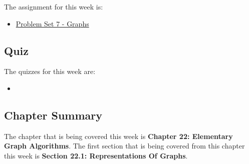The assignment for this week is:

\begin{itemize}
    \item \href{https://github.com/QuantumCompiler/CU/tree/main/CSPB%203104%20-%20Algorithms/Assignments/Problem%20Sets/Problem%20Set%207%20-%20Graphs}{Problem Set 7 - Graphs}
\end{itemize}

\subsection{Quiz}

The quizzes for this week are:

\begin{itemize}
    \item {}
\end{itemize}

\subsection{Chapter Summary}

The chapter that is being covered this week is \textbf{Chapter 22: Elementary Graph Algorithms}. The first section that is being covered from this chapter this week is \textbf{Section 22.1: Representations Of Graphs}.

